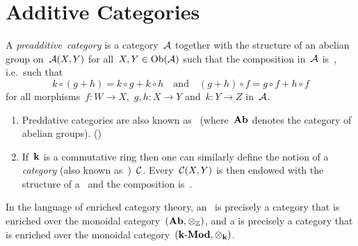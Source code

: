 \section{Additive Categories}


\begin{definition}
  A \emph{preadditive~category} is a category~$\mathcal{A}$ together with the structure of an abelian group on~$\mathcal{A}(X,Y)$ for all~$X, Y \in \operatorname{Ob}(\mathcal{A})$ such that the composition in~$\mathcal{A}$ is~{\Zbilin}, i.e.\ such that
  \[
    k \circ (g + h) = k \circ g + k \circ h
    \quad\text{and}\quad
    (g + h) \circ f = g \circ f + h \circ f
  \]
  for all morphisms~$f \colon W \to X$,~$g, h \colon X \to Y$ and~$k \colon Y \to Z$ in~$\mathcal{A}$.
\end{definition}


\begin{remark}
  \leavevmode
  \begin{enumerate}
    \item
      Preddative categories are also known as~\emph{} (where~$\mathbf{Ab}$ denotes the category of abelian groups).
      ()
    \item
      If~$\kf$ is a commutative ring then one can similarly define the notion of a \emph{{\preklin} category} (also known as~\emph{})~$\mathcal{C}$.
      Every~$\mathcal{C}(X,Y)$ is then endowed with the structure of a~{\module{$\kf$}} and the composition is~{\kbilin}.
  \end{enumerate}
\end{remark}


\begin{remark*}
  In the language of enriched category theory, an~ is precisely a category that is enriched over the monoidal category~$(\mathbf{Ab},{\otimes_{\mathbb{Z}}})$, and a  is precisely a category that is enriched over the monoidal category~$(\text{$\mathbf{k}$-$\mathbf{Mod}$}, {\otimes_{\mathbf{k}}})$.
\end{remark*}


